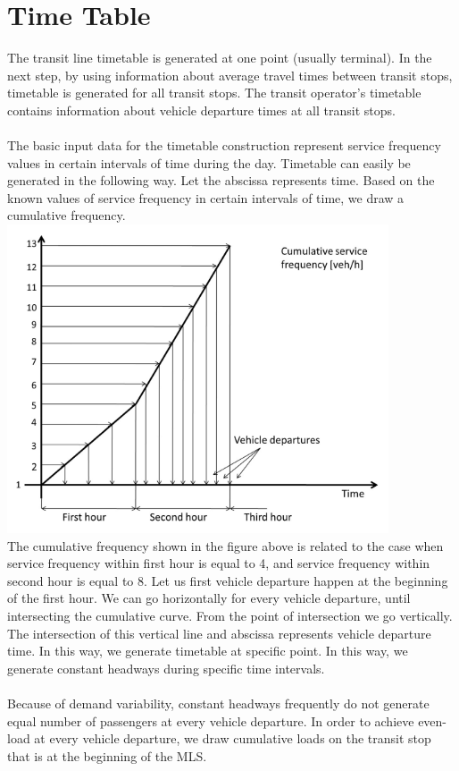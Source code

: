 \section{Time Table}
The transit line timetable is generated at one point (usually terminal). In the next step, by using information about average travel times between transit stops, timetable is generated for all transit stops. The transit operator’s timetable contains information about vehicle departure times at all transit stops.\\\\
The basic input data for the timetable construction represent service frequency values in certain intervals of time during the day. Timetable can easily be generated in the following way. Let the abscissa represents time. Based on the known values of service frequency in certain intervals of time, we draw a cumulative frequency.\\
\includegraphics{gfx/fig27.png}\\
The cumulative frequency shown in the figure above is related to the case when service frequency within first hour is equal to 4, and service frequency within second hour is equal to 8. Let us first vehicle departure happen at the beginning of the first hour. We can go horizontally for every vehicle departure, until intersecting the cumulative curve. From the point of intersection we go vertically. The intersection of this vertical line and abscissa represents vehicle departure time. In this way, we generate timetable at specific point. In this way, we generate constant headways during specific time intervals.\\\\
Because of demand variability, constant headways frequently do not generate equal number of passengers at every vehicle departure. In order to achieve even-load at every vehicle departure, we draw cumulative loads on the transit stop that is at the beginning of the MLS.\\
